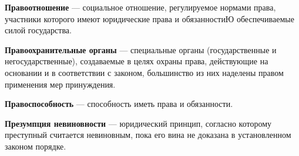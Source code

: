 \documentclass[a4paper, 12pt]{article}
\begin{document}
        \textbf{Правоотношение} --- социальное отношение, регулируемое нормами права, участники которого имеют юридические права и обязанностиЮ обеспечиваемые силой государства. \par
        \textbf{Правоохранительные органы} --- специальные органы (государственные и негосударственные), создаваемые в целях охраны права, действующие на основании и в соответствии с законом, большинство из них наделены правом применения мер принуждения. \par
        \textbf{Правоспособность} ---  способность иметь права и обязанности.\par
        \textbf{Презумпция невиновности} --- юридический принцип, согласно которому преступный считается невиновным, пока его вина не доказана в установленном законом порядке. \par
\end{document}
